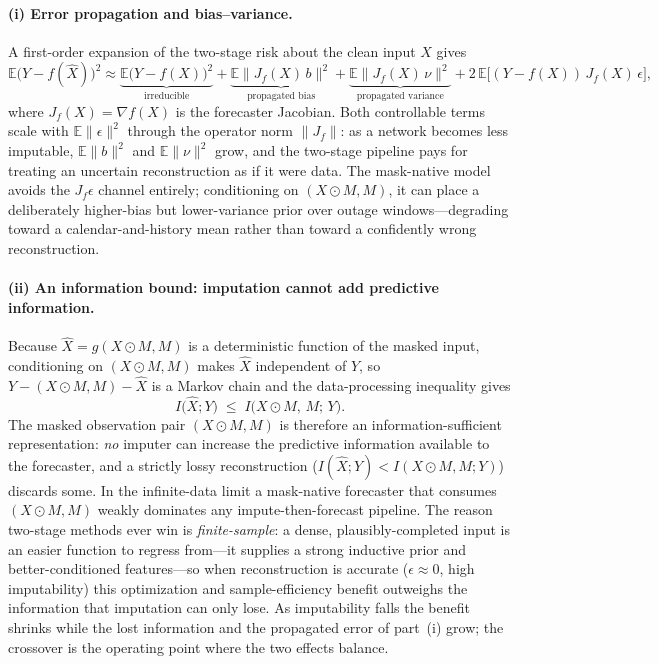 \documentclass[review,3p,times]{elsarticle}
\begin{document}
\paragraph{(i) Error propagation and bias--variance.}
A first-order expansion of the two-stage risk about the clean input $X$ gives
\[
\mathbb{E}\big(Y-f(\hat{X})\big)^2 \approx
\underbrace{\mathbb{E}\big(Y-f(X)\big)^2}_{\text{irreducible}}
+ \underbrace{\mathbb{E}\big\|J_f(X)\,b\big\|^2}_{\text{propagated bias}}
+ \underbrace{\mathbb{E}\big\|J_f(X)\,\nu\big\|^2}_{\text{propagated variance}}
+ 2\,\mathbb{E}\big[(Y-f(X))\,J_f(X)\,\epsilon\big],
\]
where $J_f(X)=\nabla f(X)$ is the forecaster Jacobian. Both controllable terms
scale with $\mathbb{E}\|\epsilon\|^2$ through the operator norm $\|J_f\|$: as a
network becomes less imputable, $\mathbb{E}\|b\|^2$ and $\mathbb{E}\|\nu\|^2$
grow, and the two-stage pipeline pays for treating an uncertain reconstruction as
if it were data. The mask-native model avoids the $J_f\epsilon$ channel entirely;
conditioning on $(X\odot M,M)$, it can place a deliberately higher-bias but
lower-variance prior over outage windows---degrading toward a
calendar-and-history mean rather than toward a confidently wrong reconstruction.

\paragraph{(ii) An information bound: imputation cannot add predictive
information.}
Because $\hat{X}=g(X\odot M,M)$ is a deterministic function of the masked input,
conditioning on $(X\odot M,M)$ makes $\hat{X}$ independent of $Y$, so
$Y - (X\odot M,M) - \hat{X}$ is a Markov chain and the data-processing inequality
gives
\[
I\big(\hat{X};Y\big)\;\le\;I\big(X\odot M,\,M;\,Y\big).
\]
The masked observation pair $(X\odot M,M)$ is therefore an
information-sufficient representation: \emph{no} imputer can increase the
predictive information available to the forecaster, and a strictly lossy
reconstruction ($I(\hat{X};Y)<I(X\odot M,M;Y)$) discards some. In the
infinite-data limit a mask-native forecaster that consumes $(X\odot M,M)$ weakly
dominates any impute-then-forecast pipeline. The reason two-stage methods ever
win is \emph{finite-sample}: a dense, plausibly-completed input is an easier
function to regress from---it supplies a strong inductive prior and
better-conditioned features---so when reconstruction is accurate
($\epsilon\!\approx\!0$, high imputability) this optimization and
sample-efficiency benefit outweighs the information that imputation can only
lose. As imputability falls the benefit shrinks while the lost information and
the propagated error of part~(i) grow; the crossover is the operating point where
the two effects balance.
\end{document}
